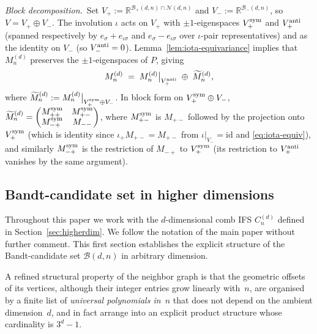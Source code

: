 \documentclass{amsart}
\theoremstyle{definition}
\theoremstyle{remark}
\newcommand{\R}{\mathbb{R}}
\begin{document}
\smallskip
\noindent\textit{Block decomposition.}\
Set $V_+ := \R^{\mathcal{B}_+(d, n) \cap \mathcal{N}(d, n)}$ and
$V_- := \R^{\mathcal{B}_-(d, n)}$, so $V = V_+ \oplus V_-$.  The
involution $\iota$ acts on $V_+$ with $\pm 1$-eigenspaces
$V_+^{\rm sym}$ and $V_+^{\rm anti}$ (spanned respectively by
$e_\sigma + e_{\iota\sigma}$ and $e_\sigma - e_{\iota\sigma}$
over $\iota$-pair representatives) and as the identity on $V_-$
(so $V_-^{\rm anti} = 0$).
Lemma~\ref{lem:iota-equivariance} implies that $M_n^{(d)}$
preserves the $\pm 1$-eigenspaces of $P$, giving
\begin{equation}\label{eq:M-decomp}
  M_n^{(d)} \;=\; M_n^{(d)}\big|_{V_+^{\rm anti}}
              \;\oplus\; \widetilde M_n^{(d)},
\end{equation}
where $\widetilde M_n^{(d)} := M_n^{(d)}\big|_{V_+^{\rm sym}
\oplus V_-}$.  In block form on $V_+^{\rm sym} \oplus V_-$,
$\widetilde M_n^{(d)} = \begin{pmatrix}
M_{++}^{\rm sym} & M_{+-}^{\rm sym} \\
M_{-+}^{\rm sym} & M_{--}
\end{pmatrix}$, where $M_{+-}^{\rm sym}$ is $M_{+-}$ followed by
the projection onto $V_+^{\rm sym}$ (which is identity since
$\iota_+ M_{+-} = M_{+-}$ from $\iota|_{V_-} = \mathrm{id}$ and
\eqref{eq:iota-equiv}), and similarly $M_{-+}^{\rm sym}$ is the
restriction of $M_{-+}$ to $V_+^{\rm sym}$ (its restriction to
$V_+^{\rm anti}$ vanishes by the same argument).


\subsection{Bandt-candidate set in higher dimensions}
\label{sec:bandt}

Throughout this paper we work with the $d$-dimensional comb IFS
$C_n^{(d)}$ defined in Section~\ref{sec:higherdim}.
We follow the notation of the main paper without further comment.
This first section establishes the explicit structure of the
Bandt-candidate set $\mathcal{B}(d, n)$ in arbitrary dimension.

A refined structural property of the neighbor graph is that
the geometric offsets of its vertices, although their integer
entries grow linearly with~$n$, are organised by a finite list
of \emph{universal polynomials in~$n$} that does not depend on
the ambient dimension~$d$, and in fact arrange into an explicit
product structure whose cardinality is $3^d - 1$.
\end{document}
